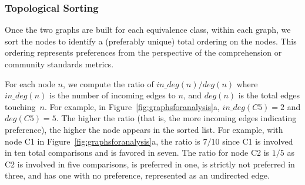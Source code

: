 \subsubsection{Topological Sorting}
Once the two graphs are built for each equivalence class, within each graph, we sort the nodes to identify a (preferably unique) total ordering on the nodes. This ordering represents preferences from the perspective of the comprehension or community standards metrics.

For each node $n$, we compute the ratio of $in\_deg(n) / deg(n)$ where $in\_deg(n)$ is the number of incoming edges to $n$, and $deg(n)$ is the total edges touching~$n$. For example, in Figure~\ref{fig:graphsforanalysis}a, $in\_deg(C5) = 2$ and $deg(C5) = 5$.
The higher the ratio (that is, the more incoming edges indicating preference), the higher the node appears in the sorted list. For example, with node C1 in Figure~\ref{fig:graphsforanalysis}a, the ratio is $7 / 10$ since C1 is involved in ten total comparisons and is favored in seven. The ratio for node C2 is $1 / 5$ as C2 is involved in five comparisons, is preferred in one, is strictly not preferred in three, and has one with no preference, represented as an undirected edge.


